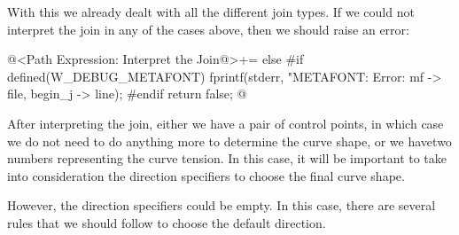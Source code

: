 With this we already dealt with all the different join types. If we
could not interpret the join in any of the cases above, then we should
raise an error:

\iniciocodigo
@<Path Expression: Interpret the Join@>+=
else{
#if defined(W_DEBUG_METAFONT)
  fprintf(stderr,
          "METAFONT: Error: %
          mf -> file, begin_j -> line);
#endif
  return false;
}
@
\fimcodigo

After interpreting the join, either we have a pair of control points,
in which case we do not need to do anything more to determine the
curve shape, or we havetwo numbers representing the curve tension. In
this case, it will be important to take into consideration the
direction specifiers to choose the final curve shape.

However, the direction specifiers could be empty. In this case, there
are several rules that we should follow to choose the default direction.






%


%


